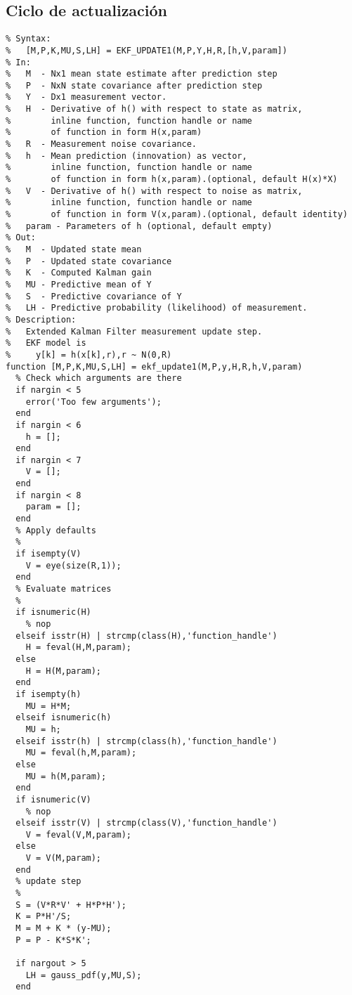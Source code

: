 \subsection{Ciclo de actualización}
\lstset{language=Matlab, breaklines=true, basicstyle=\footnotesize}
\lstset{numbers=left, numberstyle=\tiny, stepnumber=1, numbersep=-2pt}
\begin{lstlisting}[frame=single]
%EKF_UPDATE1  1st order Extended Kalman Filter update step
% Syntax:
%   [M,P,K,MU,S,LH] = EKF_UPDATE1(M,P,Y,H,R,[h,V,param])
% In:
%   M  - Nx1 mean state estimate after prediction step
%   P  - NxN state covariance after prediction step
%   Y  - Dx1 measurement vector.
%   H  - Derivative of h() with respect to state as matrix,
%        inline function, function handle or name
%        of function in form H(x,param)
%   R  - Measurement noise covariance.
%   h  - Mean prediction (innovation) as vector,
%        inline function, function handle or name
%        of function in form h(x,param).(optional, default H(x)*X)
%   V  - Derivative of h() with respect to noise as matrix,
%        inline function, function handle or name
%        of function in form V(x,param).(optional, default identity)
%   param - Parameters of h (optional, default empty)
% Out:
%   M  - Updated state mean
%   P  - Updated state covariance
%   K  - Computed Kalman gain
%   MU - Predictive mean of Y
%   S  - Predictive covariance of Y
%   LH - Predictive probability (likelihood) of measurement.  
% Description:
%   Extended Kalman Filter measurement update step.
%   EKF model is
%     y[k] = h(x[k],r),r ~ N(0,R)
function [M,P,K,MU,S,LH] = ekf_update1(M,P,y,H,R,h,V,param)
  % Check which arguments are there
  if nargin < 5
    error('Too few arguments');
  end
  if nargin < 6
    h = [];
  end
  if nargin < 7
    V = [];
  end
  if nargin < 8
    param = [];
  end
  % Apply defaults
  %
  if isempty(V)
    V = eye(size(R,1));
  end
  % Evaluate matrices
  %
  if isnumeric(H)
    % nop
  elseif isstr(H) | strcmp(class(H),'function_handle')
    H = feval(H,M,param);
  else
    H = H(M,param);
  end
  if isempty(h)
    MU = H*M;
  elseif isnumeric(h)
    MU = h;
  elseif isstr(h) | strcmp(class(h),'function_handle')
    MU = feval(h,M,param);
  else
    MU = h(M,param);
  end
  if isnumeric(V)
    % nop
  elseif isstr(V) | strcmp(class(V),'function_handle')
    V = feval(V,M,param);
  else
    V = V(M,param);
  end
  % update step
  %  
  S = (V*R*V' + H*P*H');
  K = P*H'/S;
  M = M + K * (y-MU);
  P = P - K*S*K';

  if nargout > 5
    LH = gauss_pdf(y,MU,S);
  end
\end{lstlisting}
